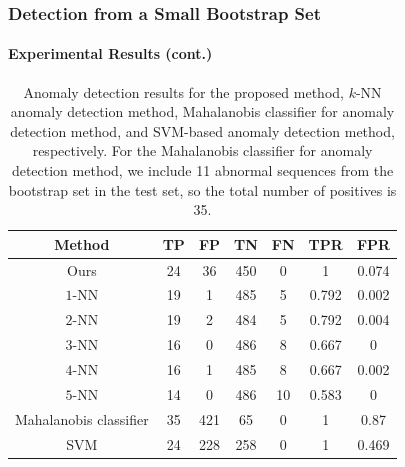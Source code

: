 \begin{frame}
    \frametitle{Detection from a Small Bootstrap Set}
    \framesubtitle{Experimental Results (cont.)}

    \begin{table}
        \caption{Anomaly detection results for the
            proposed method, $k$-NN anomaly detection method, Mahalanobis 
            classifier for anomaly detection method, and SVM-based anomaly 
            detection method, respectively. For the Mahalanobis classifier
            for anomaly detection method, we include 11 abnormal sequences from
            the bootstrap set in the test set, so the total number of
            positives is 35.}
        \centering
        \begin{tabular}{c|c|c|c|c|c|c}
            \hline
            Method & TP & FP & TN & FN & TPR & FPR \\
            \hline\hline
            Ours & 24 & 36 & 450 & 0 & 1 & 0.074 \\ \hline
            $1$-NN & 19 & 1 & 485 & 5 & 0.792 & 0.002 \\ \hline
            $2$-NN & 19 & 2 & 484 & 5 & 0.792 & 0.004 \\ \hline
            $3$-NN & 16 & 0 & 486 & 8 & 0.667 & 0 \\ \hline
            $4$-NN & 16 & 1 & 485 & 8 & 0.667 & 0.002 \\ \hline
            $5$-NN & 14 & 0 & 486 & 10 & 0.583 & 0 \\ \hline
            Mahalanobis classifier & 35 & 421 & 65 & 0 & 1 & 0.87 \\ \hline
            SVM & 24 & 228 & 258 & 0 & 1 & 0.469 \\ \hline
        \end{tabular}
        \label{tab:batch-detection-results}
    \end{table}

\end{frame}


